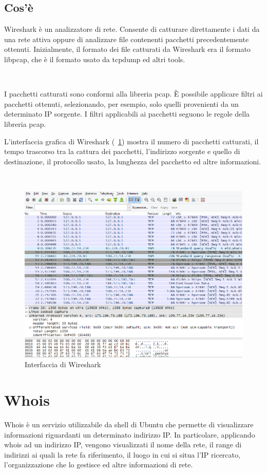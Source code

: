 \documentclass[a4paper,11pt]{book}
\begin{document}
\subsection{Cos'\`e}
Wireshark \`e un analizzatore di rete. Consente di catturare direttamente i dati da una rete attiva oppure di analizzare file contenenti pacchetti precedentemente ottenuti. Inizialmente, il formato dei file catturati da Wireshark era il formato libpcap, che \`e il formato usato da tcpdump ed altri tools.

~

I pacchetti catturati sono conformi alla libreria pcap. \`E possibile applicare filtri ai pacchetti ottenuti, selezionando, per esempio, solo quelli provenienti da un determinato IP sorgente. I filtri applicabili ai pacchetti seguono le regole della libreria pcap.

L'interfaccia grafica di Wireshark (\figurename ~\ref{fig:Whireshark}) mostra il numero di pacchetti catturati, il tempo trascorso tra la cattura dei pacchetti, l'indirizzo sorgente e quello di destinazione, il protocollo usato, la lunghezza del pacchetto ed altre informazioni.

~

\begin{figure}[!ht]
\centering
\includegraphics[scale = 0.5]{Whireshark}
\caption{Interfaccia di Wireshark}
\label{fig:Whireshark}
\end{figure}

\clearpage

\section{Whois}
Whois \`e un servizio utilizzabile da shell di Ubuntu che permette di visualizzare informazioni riguardanti un determinato indirizzo IP.
In particolare, applicando whois ad un indirizzo IP, vengono visualizzati il nome della rete, il range di indirizzi ai quali la rete fa riferimento, il luogo in cui si situa l'IP ricercato, l'organizzazione che lo gestisce ed altre informazioni di rete.
\end{document}
